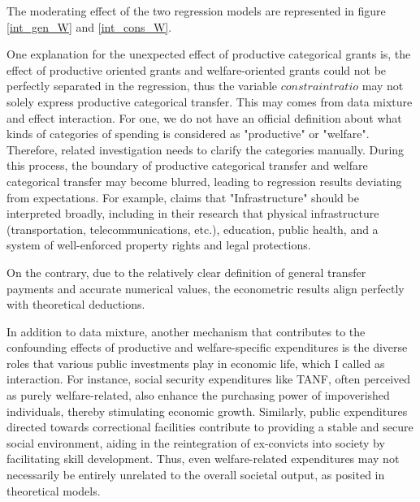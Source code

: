 The moderating effect of the two regression models are represented in figure \ref{int_gen_W} and \ref{int_cons_W}.



One explanation for the unexpected effect of productive categorical grants is, the effect of productive oriented grants and welfare-oriented grants could not be perfectly separated in the regression, thus the variable $constraintratio$ may not solely express productive categorical transfer. This may comes from data mixture and effect interaction. For one, we do not have an official definition about what kinds of categories of spending is considered as "productive" or "welfare". Therefore, related investigation needs to clarify the categories manually. During this process, the boundary of productive categorical transfer and welfare categorical transfer may become blurred, leading to regression results deviating from expectations. For example, \textcite{cai2005does} claims that "Infrastructure" should be interpreted broadly, including in their research that physical infrastructure (transportation, telecommunications, etc.), education, public health, and a system of well-enforced property rights and legal protections.

On the contrary, due to the relatively clear definition of general transfer payments and accurate numerical values, the econometric results align perfectly with theoretical deductions.

In addition to data mixture, another mechanism that contributes to the confounding effects of productive and welfare-specific expenditures is the diverse roles that various public investments play in economic life, which I called as interaction. For instance, social security expenditures like TANF, often perceived as purely welfare-related, also enhance the purchasing power of impoverished individuals, thereby stimulating economic growth. Similarly, public expenditures directed towards correctional facilities contribute to providing a stable and secure social environment, aiding in the reintegration of ex-convicts into society by facilitating skill development. Thus, even welfare-related expenditures may not necessarily be entirely unrelated to the overall societal output, as posited in theoretical models.


